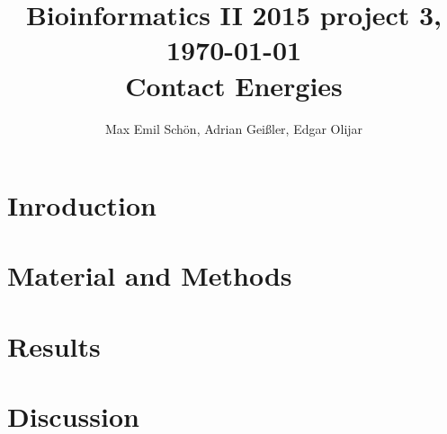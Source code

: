 \documentclass[11pt,a4paper]{article}
\renewcommand{\(}{\left (}
\renewcommand{\)}{\right )}
\begin{document}
\title{
  {\small Bioinformatics II 2015 \hfill project 3, \today}\\
   Contact Energies
}

\author{
Max Emil Schön, Adrian Geißler, Edgar Olijar
}

\maketitle




\section{Inroduction}
\section{Material and Methods}
\section{Results}
\section{Discussion}

%
%
\end{document}
